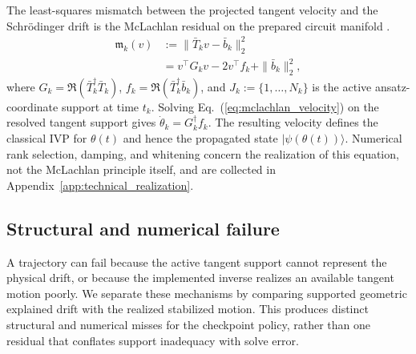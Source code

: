 \documentclass[
  reprint,
  amsmath,
  amssymb,
  aps,
  pra,
  nofootinbib,
  superscriptaddress,
  floatfix
]{revtex4-2}
\newcommand{\placeholder}[1]{\textcolor{red!70!black}{\ifmmode\left[#1\right]\else\textsf{[#1]}\fi}}
\newcommand{\ket}[1]{|#1\rangle}
\begin{document}
The least-squares mismatch between the projected tangent velocity and the Schrödinger drift is the McLachlan residual on the prepared circuit manifold \cite{McLachlan1964,Yuan2019VQS,Barison2021}.
\begin{equation}
\begin{aligned}
\mathfrak m_k(v)
&:=\|\bar T_kv-\bar b_k\|_2^2 \\
&=v^\top G_kv-2v^\top f_k+\|\bar b_k\|_2^2,
\end{aligned}
\label{eq:mclachlan_metric_objective}
\end{equation}
where
$G_k=\Re(\bar T_k^\dagger\bar T_k)$,
$f_k=\Re(\bar T_k^\dagger\bar b_k)$, and
$J_k:=\{1,\ldots,N_k\}$ is the active ansatz-coordinate support at time $t_k$.
Solving Eq.~(\ref{eq:mclachlan_velocity}) on the resolved tangent support gives $\dot\theta_k=G_k^\dagger f_k$.  The resulting velocity defines the classical IVP for $\theta(t)$ and hence the propagated state $\ket{\psi(\theta(t))}$.  Numerical rank selection, damping, and whitening concern the realization of this equation, not the McLachlan principle itself, and are collected in Appendix~\ref{app:technical_realization}.

\subsection{Structural and numerical failure}

A trajectory can fail because the active tangent support cannot represent the physical drift, or because the implemented inverse realizes an available tangent motion poorly.  We separate these mechanisms by comparing supported geometric explained drift with the realized stabilized motion.  This produces distinct structural and numerical misses for the checkpoint policy, rather than one residual that conflates support inadequacy with solve error.
\end{document}
